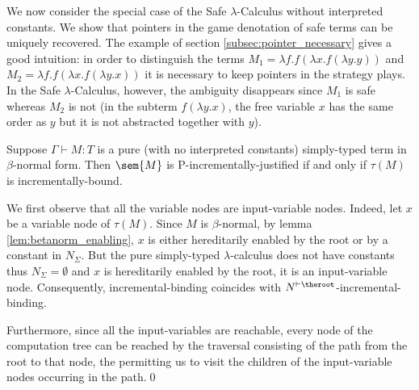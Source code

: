 We now consider the special case of the Safe $\lambda$-Calculus
without interpreted constants. We show that pointers in the game
denotation of safe terms can be uniquely recovered. The example of
section \ref{subsec:pointer_necessary} gives a good intuition: in
order to distinguish the terms $M_1 = \lambda f . f (\lambda x . f
(\lambda y .y ))$ and $M_2 = \lambda f . f (\lambda x . f (\lambda y
.x ))$ it is necessary to keep pointers in the strategy plays. In
the Safe $\lambda$-Calculus, however, the ambiguity disappears since
$M_1$ is safe whereas $M_2$ is not (in the subterm $f (\lambda y .
x)$, the free variable $x$ has the same order as $y$ but it is not
abstracted together with $y$).



\begin{corollary}
\label{cor:Nher_incrbound_iff_incrjustified}
  Suppose $\Gamma \vdash M : T$ is a pure (\ie with no interpreted constants) simply-typed term
  in $\beta$-normal form. Then $\sem{M}$ is P-incrementally-justified if and only if $\tau(M)$ is incrementally-bound.
\end{corollary}
\proof We first observe that all the variable nodes are
input-variable nodes. Indeed, let $x$ be a variable node of
$\tau(M)$. Since $M$ is $\beta$-normal, by lemma
\ref{lem:betanorm_enabling}, $x$ is either hereditarily enabled by
the root or by a constant in $N_\Sigma$. But the pure simply-typed
$\lambda$-calculus does not have constants thus $N_\Sigma =
\emptyset$ and $x$ is hereditarily enabled by the root, \ie it is an
input-variable node. Consequently, incremental-binding coincides
with $N^{\vdash \theroot}$-incremental-binding.

Furthermore, since all the input-variables are reachable, every node
of the computation tree can be reached by the traversal consisting
of the path from the root to that node, the 
permitting us to visit the children of the input-variable nodes
occurring in the path.\qed
\smallskip

